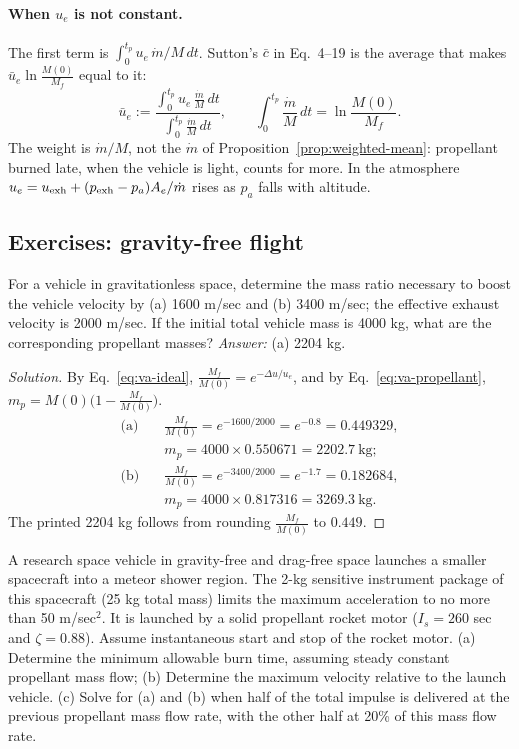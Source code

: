 \paragraph{When $u_e$ is not constant.} The first term is
$\int_0^{t_p}u_e\,\dot m/M\,dt$. Sutton's $\bar c$ in Eq.~4--19 is the
average that makes $\bar u_e\ln\frac{M(0)}{M_f}$ equal to it:
\[
 \bar u_e:=\frac{\int_0^{t_p}u_e\,\frac{\dot m}{M}\,dt}
          {\int_0^{t_p}\frac{\dot m}{M}\,dt},
 \qquad
 \int_0^{t_p}\frac{\dot m}{M}\,dt=\ln\frac{M(0)}{M_f} .
\]
The weight is $\dot m/M$, not the $\dot m$ of
Proposition~\ref{prop:weighted-mean}: propellant burned late, when the
vehicle is light, counts for more. In the atmosphere $u_e=u_{\rm exh}
+(p_{\rm exh}-p_a)A_e/\dot m$ rises as $p_a$ falls with altitude.

\subsection{Exercises: gravity-free flight}
\begin{exercise}
For a vehicle in gravitationless space, determine the mass ratio necessary
to boost the vehicle velocity by (a) 1600 m/sec and (b) 3400 m/sec; the
effective exhaust velocity is 2000 m/sec. If the initial total vehicle mass
is 4000 kg, what are the corresponding propellant masses?
\emph{Answer:} (a) 2204 kg.
\end{exercise}
\begin{proof}[Solution]
By Eq.~\ref{eq:va-ideal}, $\frac{M_f}{M(0)}=e^{-\Delta u/u_e}$, and by
Eq.~\ref{eq:va-propellant}, $m_p=M(0)\bigl(1-\frac{M_f}{M(0)}\bigr)$.
\[
\begin{aligned}
 \text{(a)}&\quad \frac{M_f}{M(0)}=e^{-1600/2000}=e^{-0.8}=0.449329,\\
 &\quad m_p=4000\times0.550671=2202.7\ \mathrm{kg};\\
 \text{(b)}&\quad \frac{M_f}{M(0)}=e^{-3400/2000}=e^{-1.7}=0.182684,\\
 &\quad m_p=4000\times0.817316=3269.3\ \mathrm{kg}.
\end{aligned}
\]
The printed 2204 kg follows from rounding $\frac{M_f}{M(0)}$ to $0.449$.
\end{proof}

\begin{exercise}
A research space vehicle in gravity-free and drag-free space launches a
smaller spacecraft into a meteor shower region. The 2-kg sensitive
instrument package of this spacecraft (25 kg total mass) limits the maximum
acceleration to no more than 50 m/sec$^2$. It is launched by a solid
propellant rocket motor ($I_s=260$ sec and $\zeta=0.88$). Assume
instantaneous start and stop of the rocket motor.
(a) Determine the minimum allowable burn time, assuming steady constant
propellant mass flow;
(b) Determine the maximum velocity relative to the launch vehicle.
(c) Solve for (a) and (b) when half of the total impulse is delivered at
the previous propellant mass flow rate, with the other half at 20\% of this
mass flow rate.
\end{exercise}
